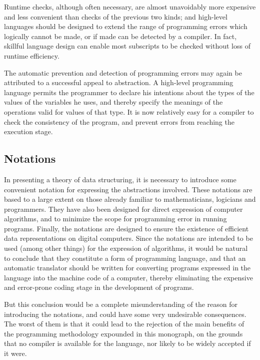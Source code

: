 \documentclass[twoside,11pt]{book}
\begin{document}
Runtime checks, although often necessary, are almost unavoidably more expensive and less convenient than checks of the previous two kinds; and high-level languages should be designed to extend the range of programming errors which logically cannot be made, or if made can be detected by a compiler. In fact, skillful language design can enable most subscripts to be checked without loss of runtime efficiency.

The automatic prevention and detection of programming errors may again be attributed to a successful appeal to abstraction. A high-level programming language permits the programmer to declare his intentions about the types of the values of the variables he uses, and thereby specify the meanings of the operations valid for values of that type. It is now relatively easy for a compiler to check the consistency of the program, and prevent errors from reaching the execution stage.

\subsection{Notations}

In presenting a theory of data structuring, it is necessary to introduce some convenient notation for expressing the abstractions involved. These notations are based to a large extent on those already familiar to mathematicians, logicians and programmers. They have also been designed for direct expression of computer algorithms, and to minimize the scope for programming error in running programs. Finally, the notations are designed to ensure the existence of efficient data representations on digital computers. Since the notations are intended to be used (among other things) for the expression of algorithms, it would be natural to conclude that they constitute a form of programming language, and that an automatic translator should be written for converting programs expressed in the language into the machine code of a computer, thereby eliminating the expensive and error-prone coding stage in the development of programs.

But this conclusion would be a complete misunderstanding of the reason for introducing the notations, and could have some very undesirable consequences. The worst of them is that it could lead to the rejection of the main benefits of the programming methodology expounded in this monograph, on the grounds that no compiler is available for the language, nor likely to be widely accepted if it were.
\end{document}
